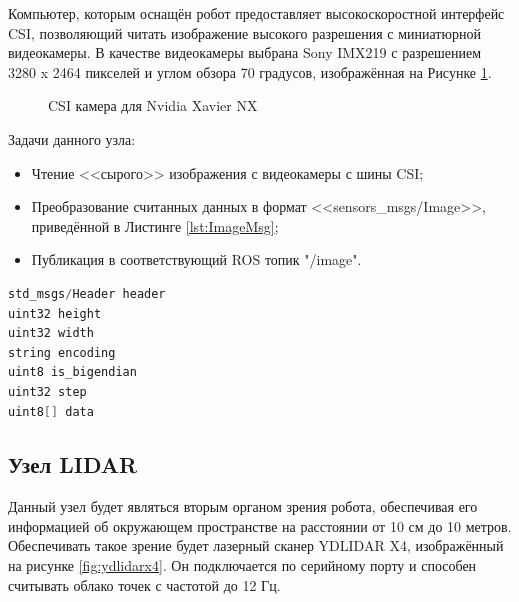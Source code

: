 \documentclass[12pt,a4paper]{scrartcl}
\begin{document}
			 	Компьютер, которым оснащён робот предоставляет высокоскоростной интерфейс CSI\cite{bib:XavierPinOut}, позволяющий читать изображение высокого разрешения с миниатюрной видеокамеры. В качестве видеокамеры выбрана Sony IMX219 с разрешением 3280 x 2464 пикселей и углом обзора 70 градусов, изображённая на Рисунке \ref{fig:csiCam}\cite{bib:CSICam}. 
			 	\begin{figure}[h]
					\caption{CSI камера для Nvidia Xavier NX}
					\label{fig:csiCam}
				\end{figure}
				
				Задачи данного узла:
				\begin{itemize}
					\item Чтение <<сырого>> изображения с видеокамеры с шины CSI;
					\item Преобразование считанных данных в формат <<sensors\_msgs/Image>>, приведённой в Листинге \ref{lst:ImageMsg}\cite{bib:ROSImageMsg};
					\item Публикация в соответствующий ROS топик "/image".
				\end{itemize}
				
				\begin{lstlisting}[language=C,caption={Формат сообщения sensors\_msgs/Image},label={lst:ImageMsg}]
std_msgs/Header header
uint32 height
uint32 width
string encoding
uint8 is_bigendian
uint32 step
uint8[] data
				\end{lstlisting}
				
			\subsection{Узел LIDAR} \label{sec:LiDAR}
				Данный узел будет являться вторым органом зрения робота, обеспечивая его информацией об окружающем пространстве на расстоянии от 10 см до 10 метров. Обеспечивать такое зрение будет лазерный сканер YDLIDAR X4, изображённый на рисунке \ref{fig:ydlidarx4}\cite{bib:ydlidarx4}. Он подключается по серийному порту и способен считывать облако точек с частотой до 12 Гц\cite{bib:ydlidarx4}. 
				
\end{document}
